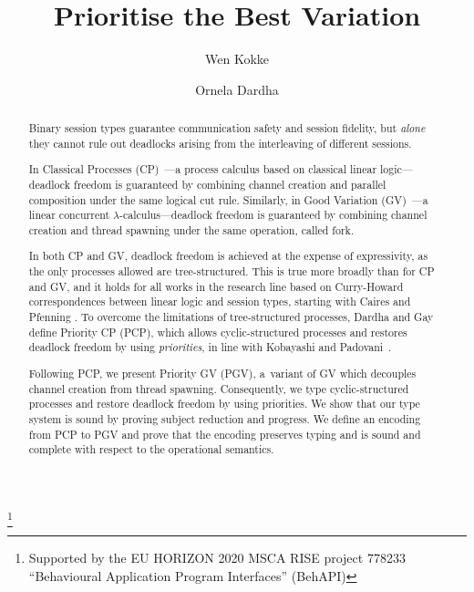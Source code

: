 \documentclass[citecolor=red,linkcolor=blue]{lmcs}
\theoremstyle{definition}
\begin{document}
%
\title{Prioritise the Best Variation}
%
\thanks{Supported by the EU HORIZON 2020 MSCA RISE project 778233 ``Behavioural Application Program Interfaces'' (BehAPI)}
%
\author[W.~Kokke]{Wen Kokke}
\address{University of Strathclyde, Glasgow, UK}

\author[O.~Dardha]{Ornela Dardha}
\address{School of Computing Science, University of Glasgow, UK}	%

\begin{abstract}
  Binary session types guarantee communication safety and session fidelity, but \emph{alone} they cannot rule out deadlocks arising from the interleaving of {different} sessions.

  In Classical Processes (CP)~\cite{wadler14}---a process calculus based on classical linear logic---deadlock freedom is guaranteed by combining channel creation and parallel composition under the same logical cut rule. Similarly, in Good Variation (GV)~\cite{wadler15,lindleymorris15}---a linear concurrent $\lambda$-calculus---deadlock freedom is guaranteed by combining channel creation and thread spawning under the same operation, called fork.

  In both CP and GV, deadlock freedom is achieved at the expense of expressivity, as the only processes allowed are tree-structured. This is true more broadly than for CP and GV, and it holds for all works in the research line based on Curry-Howard correspondences between linear logic and session types, starting with Caires and Pfenning \cite{cairespfenning10}.
  To overcome the limitations of tree-structured processes, Dardha and Gay~\cite{dardhagay18} define Priority CP (PCP), which allows cyclic-structured processes and restores deadlock freedom by using \emph{priorities}, in line with Kobayashi and Padovani~\cite{kobayashi06,padovani14}.

  Following PCP, we present Priority GV (PGV), a~variant of GV which decouples channel creation from thread spawning. Consequently, we type cyclic-structured processes and restore deadlock freedom by using priorities. We show that our type system is sound by proving subject reduction and progress. We define an encoding from PCP to PGV and prove that the encoding preserves typing and is sound and complete with respect to the operational semantics.
  \end{abstract}
%
\maketitle

{}
{}
{}
{}



\end{document}
